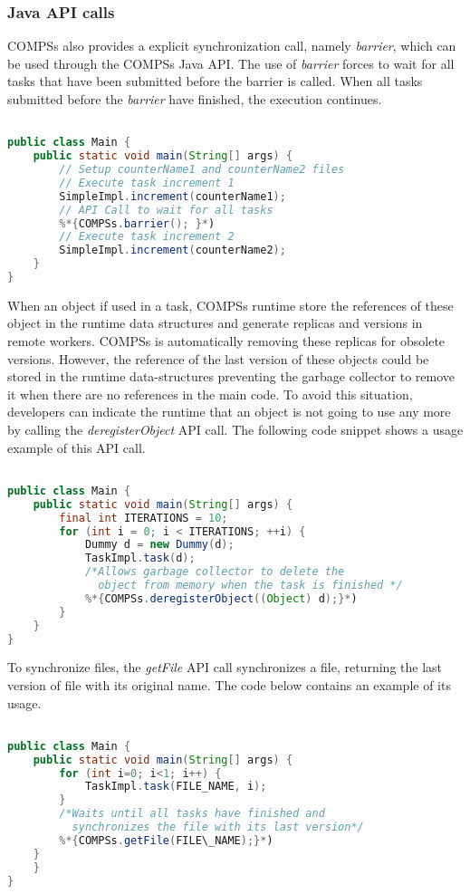 \subsubsection{Java API calls}

COMPSs also provides a explicit synchronization call, namely \textit{barrier}, which can be used through the COMPSs Java API.
The use of \textit{barrier} forces to wait for all tasks that have been submitted before the barrier is called.
When all tasks submitted before the \textit{barrier} have finished, the execution continues.

\begin{lstlisting}[language=java]
%*{\bf import es.bsc.compss.api.COMPSs;}*)

public class Main {
    public static void main(String[] args) {
        // Setup counterName1 and counterName2 files
        // Execute task increment 1
        SimpleImpl.increment(counterName1);
        // API Call to wait for all tasks
        %*{COMPSs.barrier(); }*)
        // Execute task increment 2
        SimpleImpl.increment(counterName2);
    }
}
\end{lstlisting}

When an object if used in a task, COMPSs runtime store the references of these object in the runtime data structures and generate replicas and versions in remote workers. 
COMPSs is automatically removing these replicas for obsolete versions. 
However, the reference of the last version of these objects could be stored in the runtime data-structures preventing the garbage collector to remove it when there are no references in the main code. 
To avoid this situation, developers can indicate the runtime that an object is not going to use any more by calling the \textit{deregisterObject} API call.
The following code snippet shows a usage example of this API call. 

\begin{lstlisting}[language=java]
%*{\bf import es.bsc.compss.api.COMPSs;}*)

public class Main {
    public static void main(String[] args) {
        final int ITERATIONS = 10;
        for (int i = 0; i < ITERATIONS; ++i) {
            Dummy d = new Dummy(d);
            TaskImpl.task(d);
            /*Allows garbage collector to delete the 
              object from memory when the task is finished */     
            %*{COMPSs.deregisterObject((Object) d);}*)
        }
    }
}
\end{lstlisting}

To synchronize files, the \textit{getFile} API call synchronizes a file, returning the last version of file with its original name. The code below contains an example of its usage.
\begin{lstlisting}[language=java] 
%*{\bf import es.bsc.compss.api.COMPSs;}*)

public class Main {
    public static void main(String[] args) {
        for (int i=0; i<1; i++) {
            TaskImpl.task(FILE_NAME, i);
        }
        /*Waits until all tasks have finished and 
          synchronizes the file with its last version*/
        %*{COMPSs.getFile(FILE\_NAME);}*)
	}
    }
}
\end{lstlisting}

